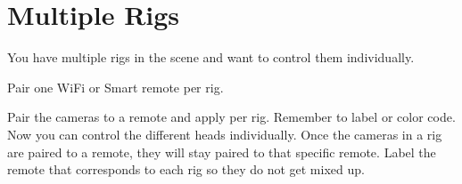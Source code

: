 \section{Multiple Rigs}
\pagecolor{white}
\label{chap:10}
\begin{fullwidth}

\problem

{\large You have multiple rigs in the scene and want to control them individually. \par}

\solution

{\large Pair one WiFi or Smart remote per rig. \par}


Pair the cameras to a remote and apply per rig. Remember to label or color code. Now you can control the different heads individually. Once the cameras in a rig are paired to a remote, they will stay paired to that specific remote. Label the remote that corresponds to each rig so they do not get mixed up. 





\clearpage
\end{fullwidth}
